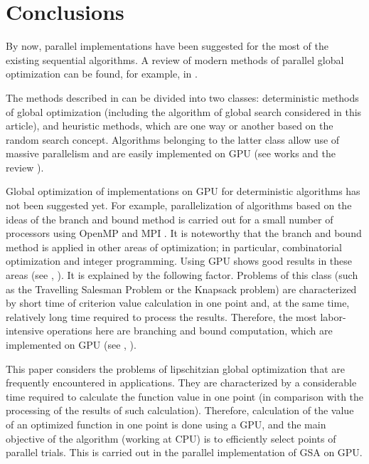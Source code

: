 \documentclass[smallcondensed]{svjour3}     %
\begin{document}
\section{Conclusions} \label{sec:7}

By now, parallel implementations have been suggested for the most of the existing sequential algorithms. A review of modern methods of parallel global optimization can be found, for example, in \cite{RefApuzzo}. 

The methods described in \cite{RefApuzzo} can be divided into two classes: deterministic methods of global optimization (including the algorithm of global search considered in this article), and heuristic methods, which are one way or another based on the random search concept. Algorithms belonging to the latter class allow use of massive parallelism and are easily implemented on GPU (see works \cite{RefFerreiro,RefZhu,RefGarcia,RefMussi} and the review \cite{RefLangdon}).

Global optimization of implementations on GPU for deterministic algorithms has not been suggested yet. For example, parallelization of algorithms based on the ideas of the branch and bound method is carried out for a small number of processors using OpenMP and MPI \cite{RefPaulavicius}. It is noteworthy that the branch and bound method is applied in other areas of optimization; in particular, combinatorial optimization and integer programming. Using GPU shows good results in these areas (see \cite{RefBoukedjar}, \cite{RefCarneiro}). It is explained by the following factor. Problems of this class (such as the Travelling Salesman Problem or the Knapsack problem) are characterized by short time of criterion value calculation in one point and, at the same time, relatively long time required to process the results. Therefore, the most labor-intensive operations here are branching and bound computation, which are implemented on GPU (see \cite{RefBoukedjar}, \cite{RefCarneiro}).

This paper considers the problems of lipschitzian global optimization that are frequently encountered in applications. They are characterized by a considerable time required to calculate the function value in one point (in comparison with the processing of the results of such calculation). Therefore, calculation of the value of an optimized function in one point is done using a GPU, and the main objective of the algorithm (working at CPU) is to efficiently select points of parallel trials. This is carried out in the parallel implementation of GSA on GPU.
\end{document}
